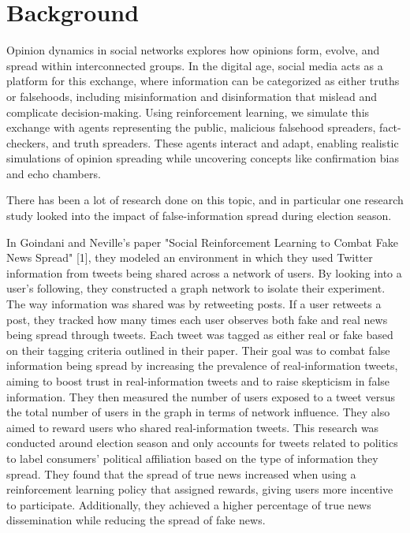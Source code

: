 \documentclass[twoside]{article}
\begin{document}
\section{Background}
Opinion dynamics in social networks explores how opinions form, evolve, and spread within interconnected groups. In the digital age, social media acts as a platform for this exchange, where information can be categorized as either truths or falsehoods, including misinformation and disinformation that mislead and complicate decision-making. Using reinforcement learning, we simulate this exchange with agents representing the public, malicious falsehood spreaders, fact-checkers, and truth spreaders. These agents interact and adapt, enabling realistic simulations of opinion spreading while uncovering concepts like confirmation bias and echo chambers.


There has been a lot of research done on this topic, and in particular one research study looked into the impact of false-information spread during election season.

In Goindani and Neville's paper "Social Reinforcement Learning to Combat Fake News Spread" [1], they modeled an environment in which they used Twitter information from tweets being shared across a network of users. By looking into a user's following, they constructed a graph network to isolate their experiment. The way information was shared was by retweeting posts. If a user retweets a post, they tracked how many times each user observes both fake and real news being spread through tweets. Each tweet was tagged as either real or fake based on their tagging criteria outlined in their paper. Their goal was to combat false information being spread by increasing the prevalence of real-information tweets, aiming to boost trust in real-information tweets and to raise skepticism in false information. They then measured the number of users exposed to a tweet versus the total number of users in the graph in terms of network influence. They also aimed to reward users who shared real-information tweets. This research was conducted around election season and only accounts for tweets related to politics to label consumers' political affiliation based on the type of information they spread. They found that the spread of true news increased when using a reinforcement learning policy that assigned rewards, giving users more incentive to participate. Additionally, they achieved a higher percentage of true news dissemination while reducing the spread of fake news.
\end{document}
